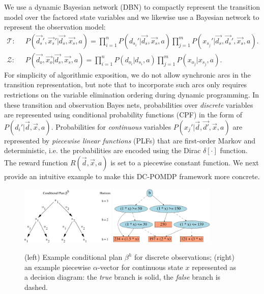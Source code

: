 \documentclass{article} %
\begin{document}
We use a dynamic Bayesian network (DBN) to compactly represent the transition model over the factored state variables and we likewise use a Bayesian network to represent the observation model:
{\footnotesize
\begin{align*}
\mathcal{T}: \;\; &
P(\vec{d_s}',\vec{x_s}'|\vec{d_s},\vec{x_s},a) = 
\prod_{i=1}^n P(d_{s_i}'|\vec{d_s},\vec{x_s},a) \prod_{j=1}^m P(x_{s_j}'|\vec{d_s},\vec{d_s}',\vec{x_s},a). \nonumber \\
\mathcal{Z}: \;\; & 
P(\vec{d_o},\vec{x_o}|\vec{d_s},\vec{x_s},a) = 
\prod_{i=1}^n P(d_{o_i}|d_{s_i},a) \prod_{j=1}^m P(x_{o_j}|x_{s_j},a). \nonumber 
\end{align*}}
For simplicity of algorithmic exposition, we do not allow synchronic
arcs in the transition representation, but note that to incorporate
such arcs only requires restrictions on the variable elimination
ordering during dynamic programming.  In these transition and
observation Bayes nets, 
probabilities over 
\emph{discrete} variables are represented using conditional probability
functions (CPF) in the form of
$P(d_i'|\vec{d},\vec{x},a)$. Probabilities for \emph{continuous} variables
$P(x_j'|\vec{d},\vec{d'},\vec{x},a)$ are represented by
\emph{piecewise linear functions} (PLFs) that are first-order Markov
and deterministic, i.e. the probabilities are encoded using the Dirac
$\delta[\cdot]$ function. The reward function $R(\vec{d},\vec{x},a)$
is set to a piecewise constant function. We next provide an intuitive
example to make this DC-POMDP framework more concrete.
\begin{figure}[t!]
\begin{center}
\includegraphics[width=0.4\textwidth]{pics/cond_plan2.pdf}
\hspace{5mm}
\includegraphics[width=0.45\textwidth]{pics/dag2.pdf}
\end{center}
\vspace{-2mm}
\caption{\footnotesize (left) Example conditional plan $\beta^h$ for discrete observations; (right) an example piecewise $\alpha$-vector for continuous state $x$ represented
as a 
decision diagram: 
the \emph{true} branch is solid, the \emph{false}
branch is dashed.}
\label{fig:cond_plan}
\vspace{-1mm}
\end{figure}
\end{document}
